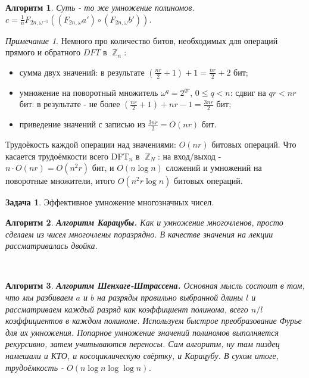 \documentclass[a4paper]{article}
\theoremstyle{indented}
\newtheorem{alg}{Алгоритм}
\theoremstyle{definition}
\newtheorem{prob}{Задача}
\theoremstyle{remark}
\newtheorem{remark}{Примечание}
\DeclareMathOperator{\ZZ}{\mathbb{Z}}
\begin{document}
\begin{alg}
    Суть - то же умножение полиномов. $c=\frac{1}{n} F_{2n, \omega^{-1}}((F_{2n, \omega}a')\circ (F_{2n, \omega}b'))$.
\end{alg}

\begin{remark}
    Немного про количество битов, необходимых для операций прямого и обратного $DFT$ в $\ZZ_n$:

    \begin{itemize}
        \item сумма двух значений: в результате $(\frac{nr}{2}+1)+1=\frac{nr}{2}+2$ бит;
        \item умножение на поворотный множитель $\omega^q=2^{qr}$, $0\leq q< n$: сдвиг на $qr<nr$ бит: в результате - не более $(\frac{nr}{2}+1)+nr-1=\frac{3nr}{2}$ бит; 
        \item приведение значений с записью из $\frac{3nr}{2}=O(nr)$ бит.
    \end{itemize}

    Трудоёкость каждой операции над значениями: $O(nr)$ битовых операций. Что касается трудоёмкости всего DFT$_n$ в $\ZZ_N$: на вход/выход - $n\cdot O(nr)=O(n^2r)$ бит, и $O(n \log n)$ сложений и умножений на поворотные множители, итого $O(n^2r \log n)$ битовых операций.
\end{remark}

\begin{prob}
    Эффективное умножение многозначных чисел.
\end{prob}

\begin{alg}
    \textbf{Алгоритм Карацубы.} Как и умножение многочленов, просто сделаем из чисел многочлены поразрядно. В качестве значения на лекции рассматривалась двойка.
\end{alg} \

\begin{alg}
    \textbf{Алгоритм Шенхаге-Штрассена.} Основная мысль состоит в том, что мы разбиваем $a$ и $b$ на разряды правильно выбранной длины $l$ и рассматриваем каждый разряд как коэффициент полинома, всего $n/l$ коэффициентов в каждом полиноме. Используем быстрое преобразование Фурье для их умножения. Попарное умножение значений полиномов выполняется рекурсивно, затем учитываются переносы. Сам алгоритм, ну там пиздец намешали и КТО, и косоциклическую свёртку, и Карацубу. В сухом итоге, трудоёмкость - $O(n\log n \log \log n)$.
\end{alg}
\end{document}
